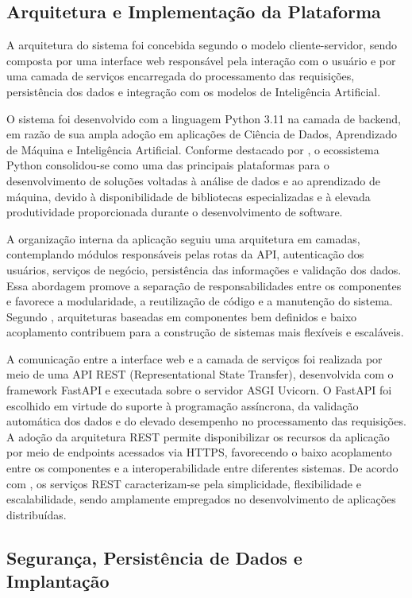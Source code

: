 \documentclass[portuguese]{sbc2025}%
\begin{document}
\subsection{Arquitetura e Implementação da Plataforma}

A arquitetura do sistema foi concebida segundo o modelo cliente-servidor, sendo composta por uma interface web responsável pela 
interação com o usuário e por uma camada de serviços encarregada do processamento das requisições, persistência dos dados e 
integração com os modelos de Inteligência Artificial.

O sistema foi desenvolvido com a linguagem Python 3.11 na camada de backend, em razão de sua ampla adoção em aplicações de Ciência 
de Dados, Aprendizado de Máquina e Inteligência Artificial. Conforme destacado por \citep{ref7}, o ecossistema Python consolidou-se
como uma das principais plataformas para o desenvolvimento de soluções voltadas à análise de dados e ao aprendizado de máquina,
devido à disponibilidade de bibliotecas especializadas e à elevada produtividade proporcionada durante o desenvolvimento de software.

A organização interna da aplicação seguiu uma arquitetura em camadas, contemplando módulos responsáveis pelas rotas da API, 
autenticação dos usuários, serviços de negócio, persistência das informações e validação dos dados. Essa abordagem promove a 
separação de responsabilidades entre os componentes e favorece a modularidade, a reutilização de código e a manutenção do sistema.
Segundo \citep{ref8}, arquiteturas baseadas em componentes bem definidos e baixo acoplamento contribuem para a construção de 
sistemas mais flexíveis e escaláveis.

A comunicação entre a interface web e a camada de serviços foi realizada por meio de uma API REST (Representational State Transfer),
desenvolvida com o framework FastAPI e executada sobre o servidor ASGI Uvicorn. O FastAPI foi escolhido em virtude do suporte à 
programação assíncrona, da validação automática dos dados e do elevado desempenho no processamento das requisições. A adoção da 
arquitetura REST permite disponibilizar os recursos da aplicação por meio de endpoints acessados via HTTPS, favorecendo o baixo 
acoplamento entre os componentes e a interoperabilidade entre diferentes sistemas. De acordo com \citep{ref9}, os serviços REST 
caracterizam-se pela simplicidade, flexibilidade e escalabilidade, sendo amplamente empregados no desenvolvimento de aplicações distribuídas.

\subsection{Segurança, Persistência de Dados e Implantação}
\end{document}
